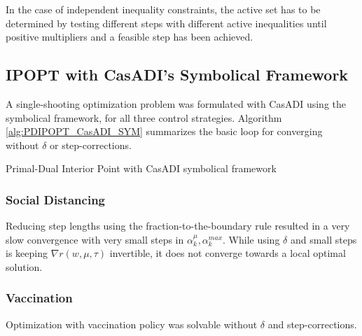 In the case of independent inequality constraints, the active set has to be determined by testing different steps with different active inequalities until positive multipliers and a feasible step has been achieved.

\subsection{IPOPT with CasADI's Symbolical Framework}
A single-shooting optimization problem was formulated with CasADI using the symbolical framework, for all three control strategies. Algorithm \ref{alg:PDIPOPT_CasADI_SYM} summarizes the basic loop for converging without $\delta$ or step-corrections.


\begin{algorithm}[H]
\SetAlgoLined
{}

 \caption{Primal-Dual Interior Point with CasADI symbolical framework}
 \label{alg:PDIPOPT_CasADI_SYM}
\end{algorithm}

\subsubsection{Social Distancing}

Reducing step lengths using the fraction-to-the-boundary rule resulted in a very slow convergence with very small steps in $\alpha_k^\mu, \alpha_k^{max}$. While using $\delta$ and small steps is keeping $\nabla r(w, \mu, \tau)$ invertible, it does not converge towards a local optimal solution.

\subsubsection{Vaccination}

Optimization with vaccination policy was solvable without $\delta$ and step-corrections.

